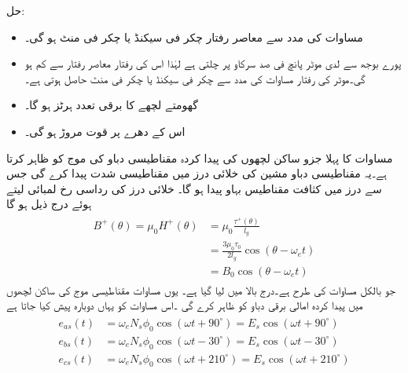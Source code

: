 حل:
\begin{itemize}
\item
مساوات   کی مدد سے معاصر رفتار  چکر فی سیکنڈ یا  چکر فی منٹ ہو گی۔
\item
پورے بوجھ سے لدی موٹر پانچ فی صد سرکاو پر چلتی ہے لہٰذا اس کی رفتار معاصر رفتار سے  کم ہو گی۔موٹر کی رفتار مساوات    کی مدد سے  چکر فی سیکنڈ یا  چکر فی منٹ حاصل ہوتی ہے۔
\item
گھومتے لچھے کا برقی تعدد   ہرٹز ہو گا۔
\item
اس کے دھرے پر قوت مروڑ  ہو گی۔
\end{itemize}
%
مساوات   کا پہلا جزو ساکن لچھوں کی پیدا کردہ مقناطیسی دباو کی موج  کو ظاہر کرتا ہے۔یہ مقناطیسی دباو مشین کی خلائی درز میں مقناطیسی شدت  پیدا کرے گی جس سے درز میں  کثافت مقناطیس بہاو  پیدا ہو گا۔ خلائی درز کی رداسی رخ  لمبائی  لیتے ہوئے درج ذیل ہو گا
\begin{gather}
\begin{aligned}\label{مساوات_امالی-سرک_تعلق_پ}
B^+(\theta)=\mu_0 H^+(\theta)&=\mu_0 \frac{\tau^+(\theta)}{l_g}\\
&=\frac{3 \mu_0 \tau_0}{2 l_g} \cos (\theta-\omega_e t)\\
&=B_0 \cos (\theta-\omega_e t)
\end{aligned}
\end{gather}
جو بالکل مساوات   کی طرح ہے۔درج بالا میں  لیا گیا ہے۔ یوں مساوات    مقناطیسی موج  کی ساکن لچھوں میں پیدا کردہ امالی برقی دباو کو ظاہر کرے گی ۔اس مساوات کو یہاں دوبارہ پیش کیا جاتا ہے
\begin{gather}
\begin{aligned}\label{مساوات_امالی_تین_دور_سائن_نما_برقی_دباو}
e_{as}(t)&=\omega_e N_s \phi_0 \cos (\omega t +90^{\circ})=E_s \cos (\omega t +90^{\circ})\\
e_{bs}(t)&=\omega_e N_s \phi_0 \cos (\omega t -30^{\circ})=E_s \cos (\omega t -30^{\circ})\\
e_{cs}(t)&=\omega_e N_s \phi_0 \cos (\omega t +210^{\circ})=E_s \cos (\omega t +210^{\circ})
\end{aligned}
\end{gather}

